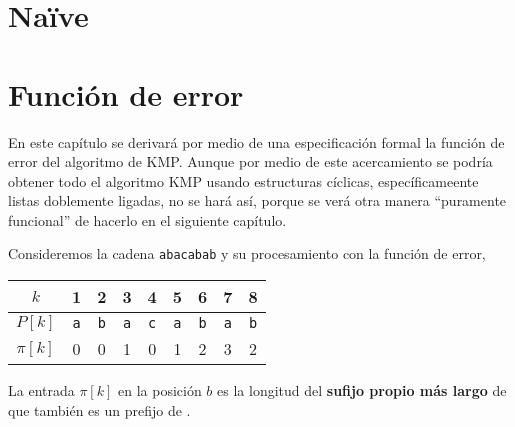 \section{Naïve}

\section{Función de error}
En este capítulo se derivará por medio de una especificación formal la función de error del
algoritmo de KMP. Aunque por medio de este acercamiento\cite{bird:cyclic} se podría obtener todo
el algoritmo KMP usando estructuras cíclicas, específicameente listas doblemente ligadas, no se
hará así, porque se verá otra manera ``puramente funcional'' de hacerlo en el siguiente capítulo.

Consideremos la cadena \texttt{abacabab} y su procesamiento con la función de error,

\begin{table}[h]
\centering
\begin{tabular}{c|c|c|c|c|c|c|c|c|}
\cline{2-9}
$k$      & 1          & 2          & 3          & 4          & 5          & 6          & 7          & 8          \\ \hline
$P[k]$   & \texttt{a} & \texttt{b} & \texttt{a} & \texttt{c} & \texttt{a} & \texttt{b} & \texttt{a} & \texttt{b} \\ \hline
$\pi[k]$ & 0          & 0          & 1          & 0          & 1          & 2          & 3          & 2          \\ \cline{2-9} 
\end{tabular}
\end{table}

La entrada $\pi[k]$ en la posición $b$ es la longitud del \textbf{sufijo propio más largo} de
 que también es un prefijo de .

